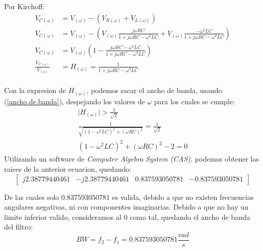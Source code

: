 \documentclass[a4paper,12pt]{report}
\begin{document}
\begin{enumerate}[label=\alph*), left=0pt]
                Por Kirchoff:
                \begin{align*}
                    V_{C(\omega)} &= V_{(\omega)} - \left( V_{R(\omega)} + V_{L(\omega)} \right)\\
                    V_{C(\omega)} &= V_{(\omega)} - \left( V_{(\omega)} \frac{j \omega R C}{1 + j \omega R C -
                        \omega^2 L C} + V_{(\omega)} \frac{-\omega^2 L C}{1 + j \omega R C - \omega^2 L C} \right)\\
                    V_{C(\omega)} &= V_{(\omega)} \left( 1 - \frac{j \omega R C - \omega^2 L C}{1 + j \omega R C -
                        \omega^2 L C} \right)\\
                    \frac{V_{C(\omega)}}{V_{(\omega)}} &= H_{(\omega)} = \frac{1}{1 + j \omega R C - \omega^2 L C}\\
                \end{align*}

                Con la expresion de $H_{(\omega)}$, podemos sacar el ancho de banda, usando (\ref{ancho.de.banda}),
                despejando los valores de $\omega$ para los cuales se cumple:
                \begin{gather*}
                    \lvert H_{(\omega)} \rvert > \frac{1}{\sqrt{2}}\\
                    \frac{1}{\sqrt{(1 - \omega^2 L C)^2 + (\omega R C)^2}} = \frac{1}{\sqrt{2}}\\
                    (1 - \omega^2 L C)^2 + (\omega R C)^2 - 2 = 0
                \end{gather*}
                Utilizando un software de \textit{Computer Algebra System (CAS)}, podemos obtener las raices de la
                anterior ecuacion, quedando:
                \begin{equation*}
                    \begin{bmatrix}
                        j 2.38779440461 & -j 2.38779440461 & 0.837593050781 & -0.837593050781
                    \end{bmatrix}
                \end{equation*}
                
                De las cuales solo $0.837593050781$ es valida, debido a que no existen frecuencias angulares negativas,
                ni con componentes imaginarias. Debido a que no hay un limite inferior valido, consideramos al 0 como
                tal, quedando el ancho de banda del filtro:
                \begin{equation*}
                    BW = f_2 - f_1 = 0.837593050781 \frac{rad}{s}
                \end{equation*}


\end{enumerate}
\end{document}
